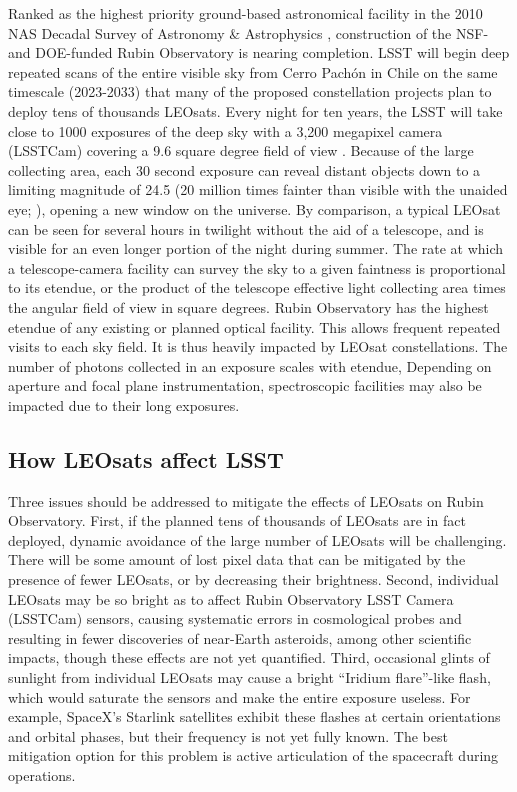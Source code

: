 \documentclass[twocolumn,trackchanges]{aastex63}
\begin{document}
Ranked as the highest priority ground-based astronomical facility in the 2010 NAS Decadal Survey of Astronomy \& Astrophysics \citep{NAP12951}, construction of the NSF- and DOE-funded Rubin Observatory is nearing completion. LSST will begin deep repeated scans of the entire visible sky from Cerro Pach\'on in Chile on the same timescale (2023-2033) that many of the proposed constellation projects plan to deploy tens of thousands LEOsats. Every night for ten years, the LSST will take close to 1000 exposures of the deep sky with a 3,200 megapixel camera (LSSTCam) covering a 9.6 square degree field of view \citep{2019ApJ...873..111I}. Because of the large collecting area, each 30 second exposure can reveal distant objects down to a limiting magnitude of 24.5 (20 million times fainter than visible with the unaided eye; \citealt{10.1093/mnras/stu992}), opening a new window on the universe.
By comparison, a typical LEOsat can be seen for several hours in twilight without the aid of a telescope, and is visible for an even longer portion of the night during summer. The rate at which a telescope-camera facility can survey the sky to a given faintness is proportional to its etendue, or the product of the telescope effective light collecting area times the angular field of view in square degrees. Rubin Observatory has the highest etendue of any existing or planned optical facility. This allows frequent repeated visits to each sky field. It is thus heavily impacted by LEOsat constellations. The number of photons collected in an exposure scales with etendue,   Depending on aperture and focal plane instrumentation, spectroscopic facilities may also be impacted due to their long exposures.


\subsection{How LEOsats affect LSST} \label{subsec:impact}

Three issues should be addressed to mitigate the effects of LEOsats on Rubin Observatory.
First, if the planned tens of thousands of LEOsats are in fact deployed, dynamic avoidance of the large number of LEOsats will be challenging. There will be some amount of lost pixel data that can be mitigated by the presence of fewer LEOsats, or by decreasing their brightness. 
Second, individual LEOsats may be so bright as to affect Rubin Observatory LSST Camera (LSSTCam) sensors, causing systematic errors in cosmological probes and resulting in fewer discoveries of near-Earth asteroids, among other scientific impacts, though these effects are not yet quantified. 
Third, occasional glints of sunlight from individual LEOsats may cause a bright ``Iridium flare''-like flash, which would saturate the sensors and make the entire exposure useless. For example, SpaceX's Starlink satellites exhibit these flashes at certain orientations and orbital phases, but their frequency is not yet fully known. The best mitigation option for this problem is active articulation of the spacecraft during operations.
\end{document}
